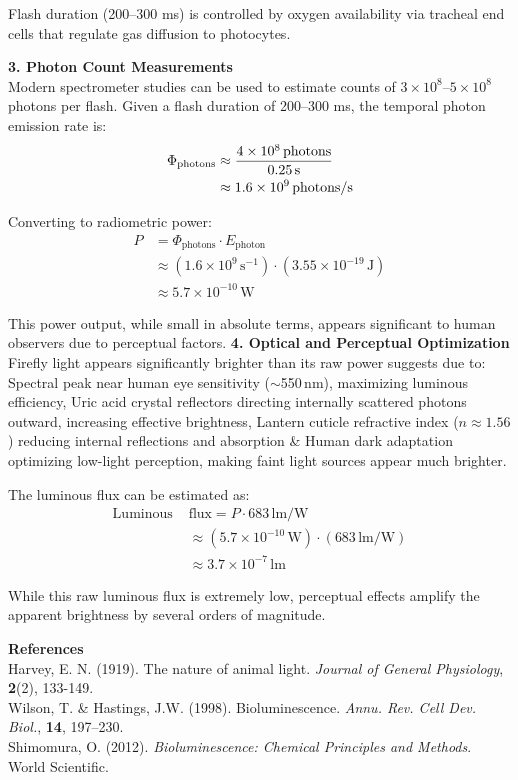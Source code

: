 \begin{technical}
Flash duration (200–300 ms) is controlled by oxygen availability via tracheal end cells that regulate gas diffusion to photocytes.

\noindent\textbf{3. Photon Count Measurements}\\
Modern spectrometer studies can be used to estimate counts of 
$3 \times 10^8$–$5 \times 10^8$ photons per flash. Given a flash duration of 200–300 ms, the temporal photon emission rate is:
\begin{align}
\Phi_{\text{photons}} &\approx 
\frac{4 \times 10^8\,\text{photons}}{0.25\,\text{s}} \notag\\
&\approx 1.6 \times 10^9\,\text{photons/s}
\end{align}

Converting to radiometric power:
\begin{align*}
P &= \Phi_{\text{photons}} \cdot E_{\text{photon}} \\
  &\approx (1.6 \times 10^9\,\text{s}^{-1}) \cdot (3.55 \times 10^{-19}\,\text{J}) \\
  &\approx 5.7 \times 10^{-10}\,\text{W}
\end{align*}

This power output, while small in absolute terms, appears significant to human observers due to perceptual factors.
\newline
\noindent\textbf{4. Optical and Perceptual Optimization}\\
Firefly light appears significantly brighter than its raw power suggests due to: Spectral peak near human eye sensitivity ($\sim$550$\,\text{nm}$), maximizing luminous efficiency, Uric acid crystal reflectors directing internally scattered photons outward, increasing effective brightness, Lantern cuticle refractive index ($n \approx 1.56$) reducing internal reflections and absorption \& Human dark adaptation optimizing low-light perception, making faint light sources appear much brighter.

The luminous flux can be estimated as:
\begin{align*}
\text{Luminous }&\text{flux} = P \cdot 683\,\text{lm/W} \\
&\approx (5.7 \times 10^{-10}\,\text{W}) \cdot (683\,\text{lm/W}) \\
&\approx 3.7 \times 10^{-7}\,\text{lm}
\end{align*}

While this raw luminous flux is extremely low, perceptual effects amplify the apparent brightness by several orders of magnitude. 

\vspace{0.5em}
\noindent\textbf{References}\\
Harvey, E. N. (1919). The nature of animal light. \textit{Journal of General Physiology}, \textbf{2}(2), 133-149.\\
Wilson, T. \& Hastings, J.W. (1998). Bioluminescence. \textit{Annu. Rev. Cell Dev. Biol.}, \textbf{14}, 197--230.\\
Shimomura, O. (2012). \textit{Bioluminescence: Chemical Principles and Methods}. World Scientific.\\
\end{technical}